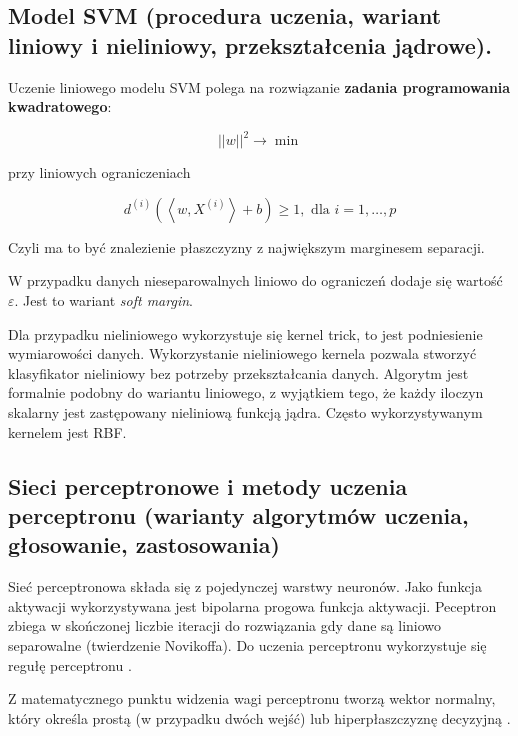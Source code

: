 \documentclass[wi]{zut}
\begin{document}
\subsection{Model SVM (procedura uczenia, wariant liniowy i nieliniowy, przekształcenia jądrowe).}

Uczenie liniowego modelu SVM polega na rozwiązanie \textbf{zadania programowania kwadratowego}:

\begin{equation}
    ||w||^2 \rightarrow \min
\end{equation}

przy liniowych ograniczeniach

\begin{equation}
    d^{(i)}\left(\left\langle w, X^{(i)}\right\rangle+b\right) \geqslant 1, \text { dla } i=1, \ldots, p
\end{equation}

Czyli ma to być znalezienie płaszczyzny z największym marginesem separacji.

W przypadku danych nieseparowalnych liniowo do ograniczeń dodaje się wartość $\varepsilon$. Jest to wariant \emph{soft margin}.

Dla przypadku nieliniowego wykorzystuje się kernel trick, to jest podniesienie wymiarowości danych. Wykorzystanie nieliniowego kernela pozwala stworzyć klasyfikator nieliniowy bez potrzeby przekształcania danych. Algorytm jest formalnie podobny do wariantu liniowego, z wyjątkiem tego, że każdy iloczyn skalarny jest zastępowany nieliniową funkcją jądra. Często wykorzystywanym kernelem jest RBF. 

\subsection{Sieci perceptronowe i metody uczenia perceptronu (warianty algorytmów uczenia, głosowanie, zastosowania)}

Sieć perceptronowa składa się z pojedynczej warstwy neuronów. Jako funkcja aktywacji wykorzystywana jest bipolarna progowa funkcja aktywacji. Peceptron zbiega w skończonej liczbie iteracji do rozwiązania gdy dane są liniowo separowalne (twierdzenie Novikoffa). Do uczenia perceptronu wykorzystuje się regułę perceptronu \cite{Korzen2020_8}.

 Z matematycznego punktu widzenia wagi perceptronu tworzą wektor normalny, który określa prostą (w przypadku dwóch wejść) lub hiperpłaszczyznę decyzyjną \cite{wiki:Perceptron}.
\end{document}
